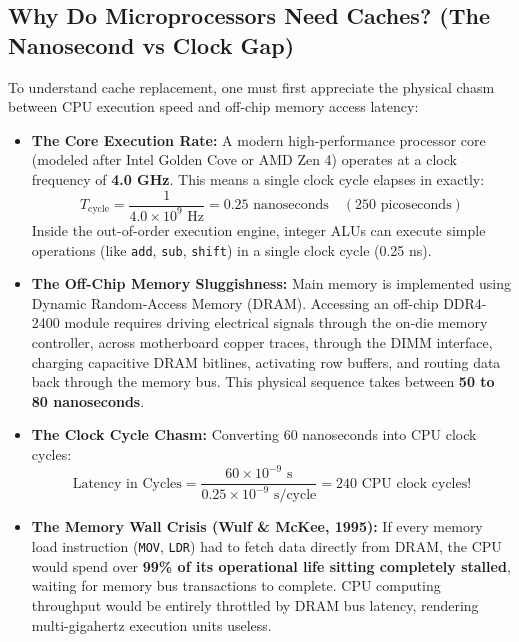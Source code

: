 \documentclass[11pt, a4paper]{article}
\begin{document}
\subsection{Why Do Microprocessors Need Caches? (The Nanosecond vs Clock Gap)}
To understand cache replacement, one must first appreciate the physical chasm between CPU execution speed and off-chip memory access latency:
\begin{itemize}[leftmargin=1.5em]
  \item \textbf{The Core Execution Rate:} A modern high-performance processor core (modeled after Intel Golden Cove or AMD Zen 4) operates at a clock frequency of \textbf{4.0 GHz}. This means a single clock cycle elapses in exactly:
  \begin{equation}
    T_{\text{cycle}} = \frac{1}{4.0 \times 10^9 \text{ Hz}} = 0.25 \text{ nanoseconds} \quad (250 \text{ picoseconds})
  \end{equation}
  Inside the out-of-order execution engine, integer ALUs can execute simple operations (like \texttt{add}, \texttt{sub}, \texttt{shift}) in a single clock cycle (0.25 ns).
  
  \item \textbf{The Off-Chip Memory Sluggishness:} Main memory is implemented using Dynamic Random-Access Memory (DRAM). Accessing an off-chip DDR4-2400 module requires driving electrical signals through the on-die memory controller, across motherboard copper traces, through the DIMM interface, charging capacitive DRAM bitlines, activating row buffers, and routing data back through the memory bus. This physical sequence takes between \textbf{50 to 80 nanoseconds}.
  
  \item \textbf{The Clock Cycle Chasm:} Converting 60 nanoseconds into CPU clock cycles:
  \begin{equation}
    \text{Latency in Cycles} = \frac{60 \times 10^{-9} \text{ s}}{0.25 \times 10^{-9} \text{ s/cycle}} = 240 \text{ CPU clock cycles!}
  \end{equation}
  \item \textbf{The Memory Wall Crisis (Wulf \& McKee, 1995):} If every memory load instruction (\texttt{MOV}, \texttt{LDR}) had to fetch data directly from DRAM, the CPU would spend over \textbf{99\% of its operational life sitting completely stalled}, waiting for memory bus transactions to complete. CPU computing throughput would be entirely throttled by DRAM bus latency, rendering multi-gigahertz execution units useless.
\end{itemize}
\end{document}

